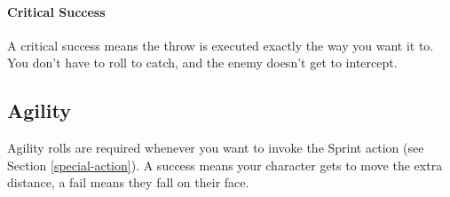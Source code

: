 \paragraph{Critical Success} A critical success means the throw is executed exactly the way you want it to.
You don't have to roll to catch, and the enemy doesn't get to intercept.

\subsection{Agility}
Agility rolls are required whenever you want to invoke the Sprint action (see Section \ref{special-action}).
A success means your character gets to move the extra distance, a fail means they fall on their face.